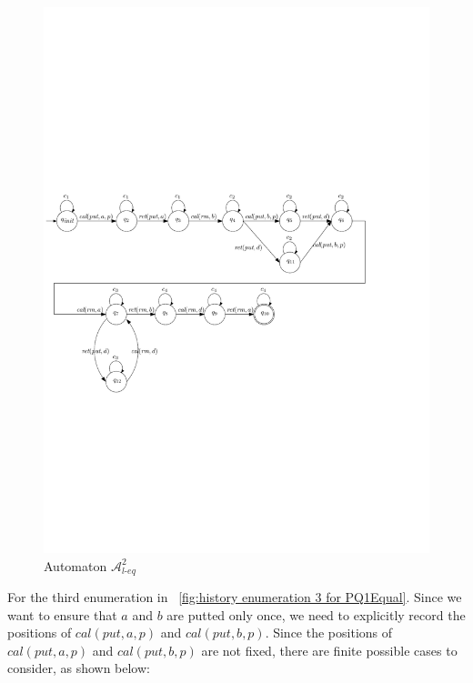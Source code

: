 \begin{figure}[htbp]
  \centering
  \includegraphics[width=0.8 \textwidth]{figures/PIC_AUTO_PQ1Equ-2.pdf}
  \caption{Automaton $\mathcal{A}_{\textit{l-eq}}^2$}
  \label{fig:automata for second enumeration of PQ1Equal}
\end{figure}

For the third enumeration in \figurename~\ref{fig:history enumeration 3 for PQ1Equal}. Since we want to ensure that $a$ and $b$ are putted only once, we need to explicitly record the positions of $\textit{cal}(\textit{put},a,p)$ and $\textit{cal}(\textit{put},b,p)$. Since the positions of $\textit{cal}(\textit{put},a,p)$ and $\textit{cal}(\textit{put},b,p)$ are not fixed, there are finite possible cases to consider, as shown below:


